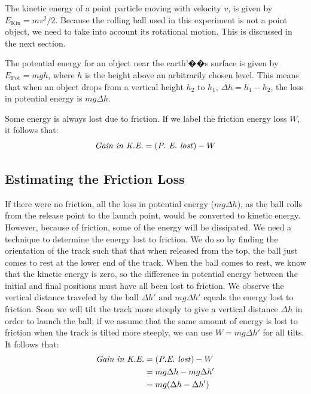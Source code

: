 The kinetic energy of a point particle moving with velocity $v$, is given by $E_{\textrm{Kin}}=mv^2/2$. Because the rolling ball used in this experiment is not a point object, we need to take into account its rotational motion. This is discussed in the next section. \myskip

The potential energy for an object near the earth'��s surface is given by $E_{\textrm{Pot}}=mgh$, where $h$ is the height above an arbitrarily chosen level. This means that when an object drops from a vertical height $h_2$ to $h_1$, $\Delta h=h_1-h_2$, the loss in potential energy is $mg\Delta h$.\myskip

Some energy is always lost due to friction. If we label the friction energy loss $W$, it follows that:
\begin{equation}
\textrm{\emph{Gain in K.E.}} = (\textrm{\emph{P. E. lost}}) - W
\end{equation}

\subsection{Estimating the Friction Loss}

If there were no friction, all the loss in potential energy ($mg\Delta h$), as the ball rolls from the release point to the launch point, would be converted to kinetic energy. However, because of friction, some of the energy will be dissipated. We need a technique to determine the energy lost to friction. We do so by finding the orientation of the track such that that when released from the top, the ball just comes to rest at the lower end of the track. When the ball comes to rest, we know that the kinetic energy is zero, so the difference in potential energy between the initial and final positions must have all been lost to friction. We observe the vertical distance traveled by the ball $\Delta h'$ and $mg\Delta h'$ equals the energy lost to friction. Soon we will tilt the track more steeply to give a vertical distance $\Delta h$ in order to launch the ball; if we assume that the same amount of energy is lost to friction when the track is tilted more steeply, we can use $W=mg\Delta h'$ for all tilts. It follows that:
\begin{align}
  \textrm{\emph{Gain in K.E.}}&=(\textrm{\emph{P.E. lost}})-W\\
  &=mg\Delta h-mg\Delta h'\\
  &=mg(\Delta h-\Delta h')
\end{align}

